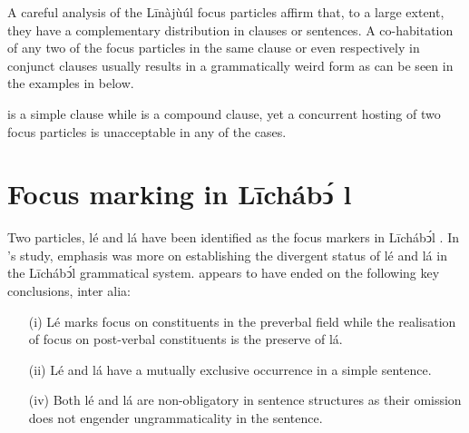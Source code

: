 \documentclass[output=paper,colorlinks,citecolor=brown]{langscibook}
\begin{document}
A careful analysis of the Līnàjùúl focus particles affirm that, to a large extent, they have a complementary distribution in clauses or sentences. A co-habitation of any two of the focus particles in the same clause or even respectively in conjunct clauses usually results in a grammatically weird form as can be seen in the examples in  below.

\ea%
    \label{ex:bisilki:21}
    \z
\z

 is a simple clause while  is a compound clause, yet a concurrent hosting of two focus particles is unacceptable in any of the cases.

\section{Focus marking in Līchábͻ́ l}\label{sec:bisilki:7}

Two particles, lé and lá have been identified as the focus markers in Līchábͻ́l \citep{Schwarz2009}. In \citeauthor{Schwarz2009}’s study, emphasis was more on establishing the divergent status of lé and lá in the Līchábͻ́l grammatical system. \citeauthor{Schwarz2009} appears to have ended on the following key conclusions, inter alia:

\begin{itemize}
    \item[(i)]  Lé marks focus on constituents in the preverbal field while the realisation of focus on post-verbal constituents is the preserve of lá.
    \item[(ii)] Lé and lá have a mutually exclusive occurrence in a simple sentence.
    \item[(iv)] Both lé and lá are non-obligatory in sentence structures as their omission does not engender ungrammaticality in the sentence.
\end{itemize}
\end{document}
